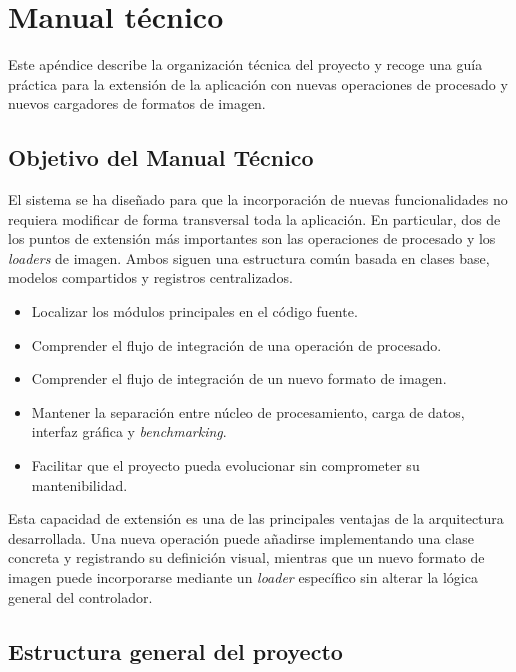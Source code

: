 \section{Manual técnico} \label{sec:appendix_B_tech_manual}

Este apéndice describe la organización técnica del proyecto y recoge una guía
práctica para la extensión de la aplicación con nuevas operaciones de procesado y nuevos
cargadores de formatos de imagen.

\subsection{Objetivo del Manual Técnico}

El sistema se ha diseñado para que la incorporación de nuevas funcionalidades no
requiera modificar de forma transversal toda la aplicación. En particular, dos de
los puntos de extensión más importantes son las operaciones de procesado y los
\textit{loaders} de imagen. Ambos siguen una estructura común basada en clases
base, modelos compartidos y registros centralizados.


\begin{itemize}[noitemsep]
    \item Localizar los módulos principales en el código fuente.
    \item Comprender el flujo de integración de una operación de procesado.
    \item Comprender el flujo de integración de un nuevo formato de imagen.
    \item Mantener la separación entre núcleo de procesamiento, carga de datos, interfaz gráfica y \textit{benchmarking}.
    \item Facilitar que el proyecto pueda evolucionar sin comprometer su mantenibilidad.
\end{itemize}

Esta capacidad de extensión es una de las principales ventajas de la
arquitectura desarrollada. Una nueva operación puede añadirse implementando una
clase concreta y registrando su definición visual, mientras que un nuevo formato
de imagen puede incorporarse mediante un \textit{loader} específico sin alterar la
lógica general del controlador.

\newpage

\subsection{Estructura general del proyecto}

